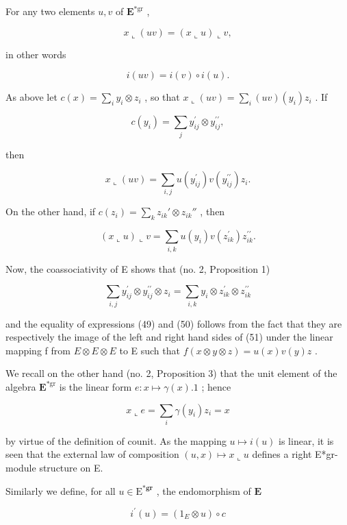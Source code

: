 For any two elements \(u, v\) of \(\mathbf{E}^{*\mathrm{gr}}\) ,

\[
x \llcorner (u v) = (x \llcorner u) \llcorner v,\tag{48}
\]

in other words

\[
i (u v) = i (v) \circ i (u).
\]

As above let \(c(x) = \sum_{i} y_{i} \otimes z_{i}\) , so that \(x \llcorner (uv) = \sum_{i} (uv)(y_{i})z_{i}\) . If

\[
c (y _ {i}) = \sum_ {j} y _ {i j} ^ {\prime} \otimes y _ {i j} ^ {\prime \prime},
\]

then

\[
x \llcorner (u v) = \sum_ {i, j} u \left(y _ {i j} ^ {\prime}\right) v \left(y _ {i j} ^ {\prime \prime}\right) z _ {i}.\tag{49}
\]

On the other hand, if \(c(z_{i}) = \sum_{k} z_{ik}' \otimes z_{ik}''\) , then

\[
(x \llcorner u) \llcorner v = \sum_ {i, k} u (y _ {i}) v (z _ {i k} ^ {\prime}) z _ {i k} ^ {\prime \prime}.\tag{50}
\]

Now, the coassociativity of E shows that (no. 2, Proposition 1)

\[
\sum_ {i, j} y _ {i j} ^ {\prime} \otimes y _ {i j} ^ {\prime \prime} \otimes z _ {i} = \sum_ {i, k} y _ {i} \otimes z _ {i k} ^ {\prime} \otimes z _ {i k} ^ {\prime \prime}\tag{51}
\]

and the equality of expressions (49) and (50) follows from the fact that they are respectively the image of the left and right hand sides of (51) under the linear mapping f from \(E \otimes E \otimes E\) to E such that \(f(x \otimes y \otimes z) = u(x)v(y)z\) .

We recall on the other hand (no. 2, Proposition 3) that the unit element of the algebra \(\mathbf{E}^{*\mathrm{gr}}\) is the linear form \(e: x \mapsto \gamma(x).1\) ; hence

\[
x \llcorner e = \sum_ {i} \gamma (y _ {i}) z _ {i} = x
\]

by virtue of the definition of counit. As the mapping \(u \mapsto i(u)\) is linear, it is seen that the external law of composition \((u, x) \mapsto x \llcorner u\) defines a right E*gr-module structure on E.

Similarly we define, for all \(u \in \mathrm{E}^{*\mathbf{g}\mathbf{r}}\) , the endomorphism of \(\mathbf{E}\)

\[
i ^ {\prime} (u) = \left(1 _ {E} \otimes u\right) \circ c\tag{52}
\]

